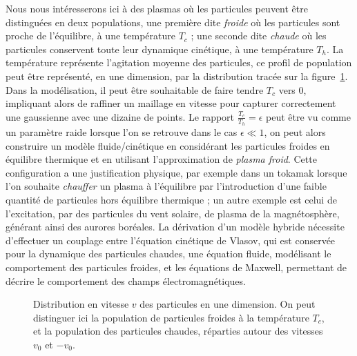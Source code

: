 Nous nous intéresserons ici à des plasmas où les particules peuvent être distinguées en deux populations, une première dite \emph{froide} où les particules sont proche de l'équilibre, à une température $T_c$ ; une seconde dite \emph{chaude} où les particules conservent toute leur dynamique cinétique, à une température $T_h$. La température représente l'agitation moyenne des particules, ce profil de population peut être représenté, en une dimension, par la distribution tracée sur la figure~\ref{fig:intro:distrib}. Dans la modélisation, il peut être souhaitable de faire tendre $T_c$ vers $0$, impliquant alors de raffiner un maillage en vitesse pour capturer correctement une gaussienne avec une dizaine de points. Le rapport $\frac{T_c}{T_h}=\epsilon$ peut être vu comme un paramètre raide lorsque l'on se retrouve dans le cas $\epsilon \ll 1$, on peut alors construire un modèle fluide/cinétique en considérant les particules froides en équilibre thermique et en utilisant l'approximation de \emph{plasma froid}. Cette configuration a une justification physique, par exemple dans un tokamak lorsque l'on souhaite \emph{chauffer} un plasma à l'équilibre par l'introduction d'une faible quantité de particules hors équilibre thermique ; un autre exemple est celui de l’excitation, par des particules du vent solaire, de plasma de la magnétosphère, générant ainsi des aurores boréales. La dérivation d'un modèle hybride nécessite d'effectuer un couplage entre l'équation cinétique de Vlasov, qui est conservée pour la dynamique des particules chaudes, une équation fluide, modélisant le comportement des particules froides, et les équations de Maxwell, permettant de décrire le comportement des champs électromagnétiques. 

\begin{figure}[h]
  \centering
  
  \caption{Distribution en vitesse $v$ des particules en une dimension. On peut distinguer ici la population de particules froides à la température $T_c$, et la population des particules chaudes, réparties autour des vitesses $v_0$ et $-v_0$.}
  \label{fig:intro:distrib}
\end{figure}
